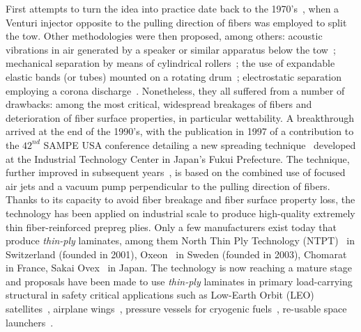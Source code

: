 \begin{description}
First attempts to turn the idea into practice date back to the 1970's~\cite{spreadtowpatent:1974}, when a Venturi injector opposite to the pulling direction of fibers was employed to split the tow. Other methodologies were then proposed, among others: acoustic vibrations in air generated by a speaker or similar apparatus below the tow~\cite{spreadtowpatent:1991}; mechanical separation by means of cylindrical rollers~\cite{spreadtowpatent:1992}; the use of expandable elastic bands (or tubes) mounted on a rotating drum~\cite{spreadtowpatent:2000}; electrostatic separation employing a corona discharge~\cite{spreadtowpatent:1993}. Nonetheless, they all suffered from a number of drawbacks: among the most critical, widespread breakages of fibers and deterioration of fiber surface properties, in particular wettability. A breakthrough arrived at the end of the 1990's, with the publication in 1997 of a contribution to the $42^{nd}$ SAMPE USA conference detailing a new spreading technique~\cite{Intro:KawabeTomodaMatsuo:1997} developed at the Industrial Technology Center in Japan's Fukui Prefecture. The technique, further improved in subsequent years~\cite{spreadtowpatent:2003,Intro:Kawabe:2008,Intro:SasayamaTomoda:2009}, is based on the combined use of focused air jets and a vacuum pump perpendicular to the pulling direction of fibers. Thanks to its capacity to avoid fiber breakage and fiber surface property loss, the technology has been applied on industrial scale to produce high-quality extremely thin fiber-reinforced prepreg plies. Only a few manufacturers exist today that produce \emph{thin-ply} laminates, among them North Thin Ply Technology (NTPT)~\cite{ntpt} in Switzerland (founded in 2001), Oxeon~\cite{oxeon} in Sweden (founded in 2003), Chomarat~\cite{chomarat} in France, Sakai Ovex~\cite{sakai} in Japan. The technology is now reaching a mature stage and proposals have been made to use \emph{thin-ply} laminates in primary load-carrying structural in safety critical applications such as Low-Earth Orbit (LEO) satellites~\cite{Moon2011}, airplane wings~\cite{Kim2017}, pressure vessels for cryogenic fuels~\cite{McCarville2018}, re-usable space launchers~\cite{Kopp2017}.\\

\end{description}
